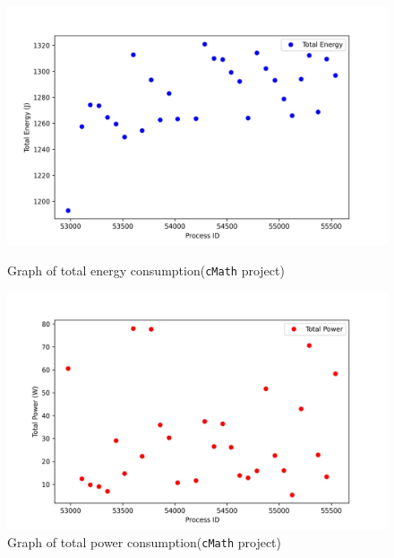 \begin{figure}[htbp]
  \centering
  \begin{center}
    \begin{minipage}[b]{0.49\textwidth}
      \centering
      \includegraphics[width=\linewidth]{img/cMath_project_energy.jpeg}
      \caption{Graph of total energy consumption(\texttt{cMath} project)}
      \label{fig:Graph of total energy consumption for cMath project}
    \end{minipage}
    \hfill
    \begin{minipage}[b]{0.49\textwidth}
      \centering
      \includegraphics[width=\linewidth]{img/cMath_project_power.jpeg}
      \caption{Graph of total power consumption(\texttt{cMath} project)}
      \label{fig:Graph of total power consumption for cMath project}
    \end{minipage}
  \end{center}
\end{figure}


